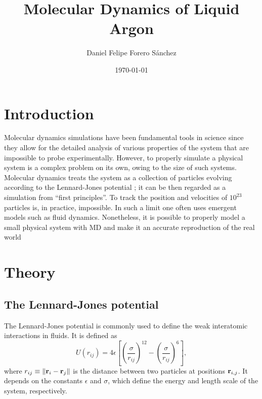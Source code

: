 \documentclass[%
aps,
pra,%
amsmath,amssymb,
preprint,%
reprint,%
notitlepage,
a4paper]{revtex4-1}
\begin{document}
	
	
	\title[Computer Simulation of Physical Systems]{Molecular Dynamics of Liquid Argon}%
	
	\author{Daniel Felipe Forero Sánchez}
	
	
	\date{\today}%

	
	\begin{abstract}
		

	\end{abstract}


	\maketitle

	
	\section{Introduction}
	Molecular dynamics simulations have been fundamental tools in science since they allow for the detailed analysis of various properties of the system that are impossible to probe experimentally. However, to properly simulate a physical system is a complex problem on its own, owing to the size of such systems. Molecular dynamics treats the system as a collection of particles evolving according to the Lennard-Jones potential \cite{Jones1924}; it can be then regarded as a simulation from ``first principles''. To track the position and velocities of $10^{23}$ particles is, in practice, impossible. In such a limit one often uses emergent models such as fluid dynamics. Nonetheless, it is possible to properly model a small physical system with MD and make it an accurate reproduction of the real world \cite{Rahman1964}
\section{Theory}
\subsection{The Lennard-Jones potential}
The Lennard-Jones potential \cite{Jones1924} is commonly used to define the weak interatomic interactions in fluids. It is defined as
\begin{equation}
U(r_{ij}) = 4\epsilon\left[\left(\frac{\sigma}{r_{ij}}\right)^{12} - \left(\frac{\sigma}{r_{ij}}\right)^{6}\right],
\label{eq:lennardjones}
\end{equation}
where $r_{ij} \equiv \norm{\vb{r}_i - \vb{r}_j}$ is the distance between two particles at positions $\vb{r}_{i,j}$. It depends on the constants $\epsilon$ and $\sigma$, which define the energy and length scale of the system, respectively.
\end{document}
